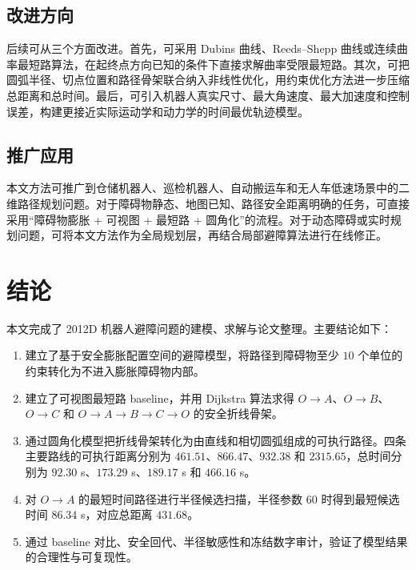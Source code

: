 \documentclass[UTF8,a4paper,12pt]{ctexart}
\begin{document}
\subsection{改进方向}
后续可从三个方面改进。首先，可采用 Dubins 曲线、Reeds--Shepp 曲线或连续曲率最短路算法，在起终点方向已知的条件下直接求解曲率受限最短路。其次，可把圆弧半径、切点位置和路径骨架联合纳入非线性优化，用约束优化方法进一步压缩总距离和总时间。最后，可引入机器人真实尺寸、最大角速度、最大加速度和控制误差，构建更接近实际运动学和动力学的时间最优轨迹模型。

\subsection{推广应用}
本文方法可推广到仓储机器人、巡检机器人、自动搬运车和无人车低速场景中的二维路径规划问题。对于障碍物静态、地图已知、路径安全距离明确的任务，可直接采用“障碍物膨胀 + 可视图 + 最短路 + 圆角化”的流程。对于动态障碍或实时规划问题，可将本文方法作为全局规划层，再结合局部避障算法进行在线修正。

\section{结论}
本文完成了 2012D 机器人避障问题的建模、求解与论文整理。主要结论如下：
\begin{enumerate}
    \item 建立了基于安全膨胀配置空间的避障模型，将路径到障碍物至少 $10$ 个单位的约束转化为不进入膨胀障碍物内部。
    \item 建立了可视图最短路 baseline，并用 Dijkstra 算法求得 $O\to A$、$O\to B$、$O\to C$ 和 $O\to A\to B\to C\to O$ 的安全折线骨架。
    \item 通过圆角化模型把折线骨架转化为由直线和相切圆弧组成的可执行路径。四条主要路线的可执行距离分别为 $461.51$、$866.47$、$932.38$ 和 $2315.65$，总时间分别为 $92.30$ s、$173.29$ s、$189.17$ s 和 $466.16$ s。
    \item 对 $O\to A$ 的最短时间路径进行半径候选扫描，半径参数 $60$ 时得到最短候选时间 $86.34$ s，对应总距离 $431.68$。
    \item 通过 baseline 对比、安全回代、半径敏感性和冻结数字审计，验证了模型结果的合理性与可复现性。
\end{enumerate}
\end{document}
